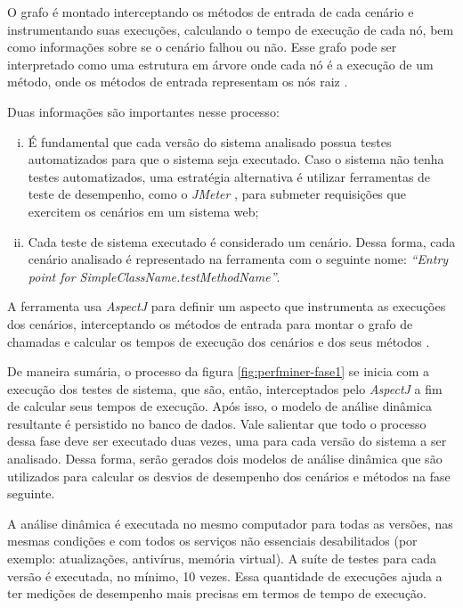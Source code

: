 O grafo é montado interceptando os métodos de entrada de cada cenário e instrumentando suas execuções, calculando o tempo de execução de cada nó, bem como informações sobre se o cenário falhou ou não. Esse grafo pode ser interpretado como uma estrutura em árvore onde cada nó é a execução de um método, onde os métodos de entrada representam os nós raiz \cite{Pinto2015}.

Duas informações são importantes nesse processo:
\begin{enumerate}[(i)]
   \item É fundamental que cada versão do sistema analisado possua testes automatizados para que o sistema seja executado. Caso o sistema não tenha testes automatizados, uma estratégia alternativa é utilizar ferramentas de teste de desempenho, como o \textit{JMeter} \cite{ApacheJMeter2016}, para submeter requisições que exercitem os cenários em um sistema web;
   \item Cada teste de sistema executado é considerado um cenário. Dessa forma, cada cenário analisado é representado na ferramenta com o seguinte nome: \textit{``Entry point for SimpleClassName.testMethodName''}.
\end{enumerate}

A ferramenta usa \textit{AspectJ} para definir um aspecto que instrumenta as execuções dos cenários, interceptando os métodos de entrada para montar o grafo de chamadas e calcular os tempos de execução dos cenários e dos seus métodos \cite{Pinto2015}.

De maneira sumária, o processo da figura \ref{fig:perfminer-fase1} se inicia com a execução dos testes de sistema, que são, então, interceptados pelo \textit{AspectJ} a fim de calcular seus tempos de execução. Após isso, o modelo de análise dinâmica resultante é persistido no banco de dados. Vale salientar que todo o processo dessa fase deve ser executado duas vezes, uma para cada versão do sistema a ser analisado. Dessa forma, serão gerados dois modelos de análise dinâmica que são utilizados para calcular os desvios de desempenho dos cenários e métodos na fase seguinte.

A análise dinâmica é executada no mesmo computador para todas as versões, nas mesmas condições e com todos os serviços não essenciais desabilitados (por exemplo: atualizações, antivírus, memória virtual). A suíte de testes para cada versão é executada, no mínimo, 10 vezes. Essa quantidade de execuções ajuda a ter medições de desempenho mais precisas em termos de tempo de execução.

